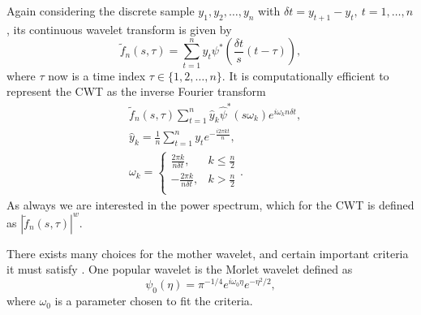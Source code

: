 \documentclass[a4paper]{memoir}
\theoremstyle{plain}
\theoremstyle{definition}
\theoremstyle{remark}
\begin{document}
Again considering the discrete sample $y_1, y_2, \hdots, y_n$ with $\delta t = y_{t+1} - y_t, \ t = 1, \hdots, n$, its continuous wavelet transform is given by \cite{torrence}
\begin{equation}\label{eq:cwt_d}
        \tilde{f}_n(s, \tau) = \sum_{t = 1}^{n} y_t \psi^* \left( \frac{\delta t}{s}(t- \tau) \right),
\end{equation}
where $\tau$ now is a time index $\tau \in \{ 1, 2, \hdots, n \}$.
It is computationally efficient \cite{torrence} to represent the CWT as the inverse Fourier transform
\begin{align*}
        &\tilde{f}_n(s, \tau) \sum_{t = 1}^{n}\hat{y}_k \hat{\psi}^*(s\omega_k)e^{i \omega_k n\delta t}, \\
        & \hat{y}_k = \frac{1}{n}\sum_{t = 1}^{n}y_t e^{-\frac{i2\pi kt}{n}},\\
        &\omega_k = 
                \begin{cases}
                      \frac{2\pi k}{n \delta t},   &  k \leq \frac{n}{2} \\
                      -\frac{2\pi k}{n \delta t},   &  k > \frac{n}{2} \\
                \end{cases}.
\end{align*}
As always we are interested in the power spectrum, which for the CWT is defined as $|\tilde{f}_n(s,\tau)|^w$.

There exists many choices for the mother wavelet, and certain important criteria it must satisfy \cite{kaiser}.
One popular wavelet is the Morlet wavelet defined as
\begin{equation}\label{eq:morlet}
        \psi_0(\eta) = \pi^{-1/4} e^{i\omega_0 \eta}e^{-\eta^2 / 2},
\end{equation}
where $\omega_0$ is a parameter chosen to fit the criteria.
\end{document}
